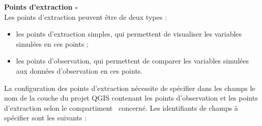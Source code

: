 \vspace{8pt}

\textbf{Points d'extraction - } \\
Les points d'extraction peuvent être de deux types :
\begin{itemize}
    \item[$\bullet$] les points d'extraction simples, qui permettent de visualiser les variables simulées en ces points ;
    \item[$\bullet$] les points d'observation, qui permettent de comparer les variables simulées aux données d'observation en ces points.
\end{itemize}



La configuration des points d'extraction nécessite de spécifier dans les champs  le nom de la couche du projet QGIS contenant les points d'observation et les points d'extraction selon le compartiment \cws~concerné. Les identifiants de champs à spécifier sont les suivants :
\vspace{8pt}

